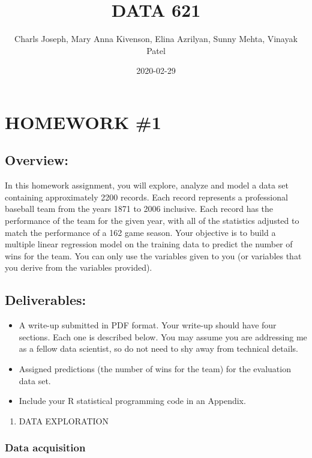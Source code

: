 \documentclass[]{article}
\title{DATA 621}
\author{Charls Joseph, Mary Anna Kivenson, Elina Azrilyan, Sunny Mehta, Vinayak
Patel}
\date{2020-02-29}
\providecommand{\tightlist}{%
  \setlength{\itemsep}{0pt}\setlength{\parskip}{0pt}}
\begin{document}
\maketitle

\hypertarget{homework-1}{%
\section{HOMEWORK \#1}\label{homework-1}}

\hypertarget{overview}{%
\subsection{Overview:}\label{overview}}

In this homework assignment, you will explore, analyze and model a data
set containing approximately 2200 records. Each record represents a
professional baseball team from the years 1871 to 2006 inclusive. Each
record has the performance of the team for the given year, with all of
the statistics adjusted to match the performance of a 162 game season.
Your objective is to build a multiple linear regression model on the
training data to predict the number of wins for the team. You can only
use the variables given to you (or variables that you derive from the
variables provided).

\hypertarget{deliverables}{%
\subsection{Deliverables:}\label{deliverables}}

\begin{itemize}
\tightlist
\item
  A write-up submitted in PDF format. Your write-up should have four
  sections. Each one is described below. You may assume you are
  addressing me as a fellow data scientist, so do not need to shy away
  from technical details.
\item
  Assigned predictions (the number of wins for the team) for the
  evaluation data set.
\item
  Include your R statistical programming code in an Appendix.
\end{itemize}

\begin{enumerate}
\def\labelenumi{\arabic{enumi}.}
\tightlist
\item
  DATA EXPLORATION
\end{enumerate}

\hypertarget{data-acquisition}{%
\subsubsection{Data acquisition}\label{data-acquisition}}
\end{document}
